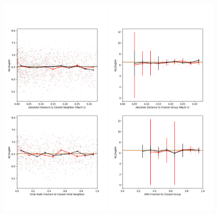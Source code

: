 \begin{figure}
    \includegraphics[width=0.49\textwidth]{Images/smallScaleEnvironment/dwarf_NH_300}
    \includegraphics[width=0.49\textwidth]{Images/smallScaleEnvironment/dwarf_NH_300_group}

\end{figure}
